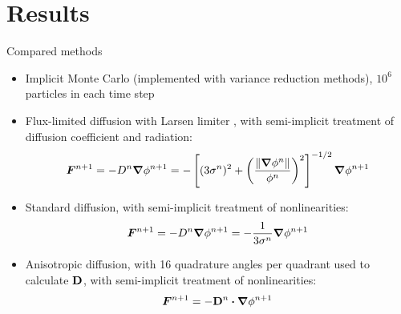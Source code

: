 \documentclass{beamer}
\newcommand{\Dtens}{\mat{D}}
\begin{document}
\section{Results}
\begin{frame}{Compared methods}
\begin{itemize}
  \item Implicit Monte Carlo \cite{Fle1971} (implemented with variance
    reduction methods), $10^6$ particles in each time step
  \item Flux-limited diffusion with Larsen limiter \cite{Ols2000}, with
    semi-implicit treatment of diffusion coefficient and radiation:
    \begin{equation*}
      \bm{F}^{n+1} = - D^{n} \bm{\nabla} \phi^{n+1}  = -\left[ (3\sigma^{n})^2
      + \left( \frac{\left\| \bm{\nabla} \phi^{n} \right\|}{\phi^{n}}  \right)^2 \right]^{-1/2}
      \bm{\nabla} \phi^{n+1}
    \end{equation*}
  \item Standard diffusion, with semi-implicit treatment of nonlinearities:
    \begin{equation*}
      \bm{F}^{n+1} = - D^{n} \bm{\nabla} \phi^{n+1} 
      = -\frac{1}{3\sigma^{n}} \bm{\nabla} \phi^{n+1}
    \end{equation*}
  \item Anisotropic diffusion, with 16 \SN{} quadrature angles per quadrant used
    to calculate $\Dtens$, with semi-implicit treatment of nonlinearities:
    \begin{equation*}
      \vec{F}^{n+1} = -\Dtens^{n}\vd \del \phi^{n+1} 
    \end{equation*}
\end{itemize}
\end{frame}
\end{document}
